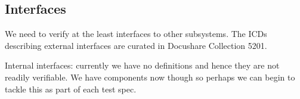 \subsection{Interfaces}

We need to verify at the least  interfaces to other subsystems. The ICDs describing external interfaces are curated in Docushare Collection 5201.


\begin{note}
  Internal interfaces: currently we have no definitions and hence they are not readily verifiable. We have components now though so perhaps we can begin to tackle this as part of each test spec. 
\end{note}
